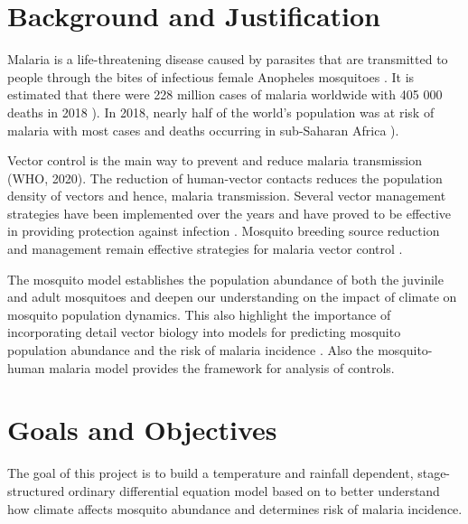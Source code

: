 \documentclass[12pt,a4paper,titlepage]{article}
\begin{document}
\section{Background and Justification}
Malaria is a life-threatening disease caused by parasites that are transmitted to people through the bites of infectious female Anopheles mosquitoes \cite{WikBlack5, beck2013temperature}. It is estimated that there were 228 million cases of malaria worldwide with 405 000 deaths in 2018 \cite{WikBlack5}). In 2018, nearly half of the world's population was at risk of malaria with most cases and deaths occurring in sub-Saharan Africa \cite{WikBlack5}).
 
Vector control is the main way to prevent and reduce malaria transmission (WHO, 2020). The reduction of human-vector contacts reduces the population density of vectors and hence, malaria transmission. Several vector management strategies have been implemented over the years and have proved to be effective in providing protection against infection \cite{Ocspp2016SuccessIM}. Mosquito breeding source reduction and management remain effective strategies for malaria vector control \cite{Ocspp2016SuccessIM}.

The mosquito model establishes the population abundance of both the juvinile and adult mosquitoes and deepen our understanding on the impact of climate on mosquito population dynamics. This also highlight the importance of incorporating detail vector biology into models for predicting mosquito population abundance and the risk of malaria incidence \cite{beck2013effect, beck2017importance}. Also the mosquito-human malaria model provides the framework for analysis of controls. 

\section{Goals and Objectives}

The goal of this project is to build a temperature and rainfall dependent, stage-structured ordinary differential equation model based on \cite{abdelrazec2017mathematical, hamdan2020effect} to better understand how climate affects mosquito abundance and determines risk of malaria incidence. 
\end{document}

